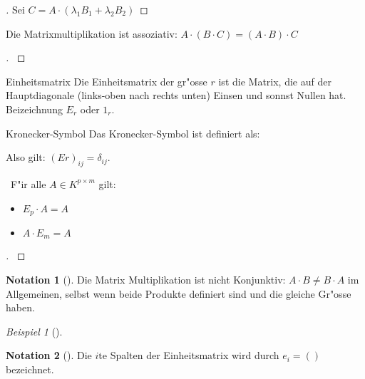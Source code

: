 \documentclass[11pt]{article}
\theoremstyle{remark}
\newtheorem{exa}{Beispiel}[section]
\theoremstyle{definition}
\newtheorem*{notation}{Notation}
\theoremstyle{remark}
\begin{document}
\begin{proof}[] \label{}
Sei \(C=A\cdot (\lambda_1 B_1 + \lambda_2 B_2)\)
\end{proof}

\begin{relation}
Die Matrixmultiplikation ist assoziativ: \(A\cdot (B\cdot C)=(A\cdot B)\cdot C\)
\end{relation}

\begin{proof}[] \label{}

\end{proof}

\begin{definition}{Einheitsmatrix}{}
Die Einheitsmatrix der gr"osse \(r\) ist die Matrix, die auf der Hauptdiagonale
(links-oben nach rechts unten) Einsen und sonnst Nullen hat. Beizeichnung \(E_r\)
oder \(1_r\).
\end{definition}

\begin{definition}{Kronecker-Symbol}{}
Das Kronecker-Symbol ist definiert als: 

Also gilt: \((Er)_{ij}=\delta_{ij}\).
\end{definition}

\begin{theo}{}{} \
F"ir alle \(A\in K^{p\times m}\) gilt:
\begin{itemize}
\item \(E_p\cdot A=A\)
\item \(A\cdot E_m =A\)
\end{itemize}
\end{theo}

\begin{proof}[] \label{}

\end{proof}


\begin{notation}[] \label{Vorsicht!}
Die Matrix Multiplikation ist nicht Konjunktiv: \(A\cdot B\not= B\cdot A\) im
Allgemeinen, selbst wenn beide Produkte definiert sind und die gleiche Gr"osse
haben.
\end{notation}

\begin{exa}[] \label{}

\end{exa}

\begin{notation}[] \label{}
Die \(i\text{te}\) Spalten der Einheitsmatrix wird durch \(e_i=()\) bezeichnet.
\end{notation}
\end{document}
